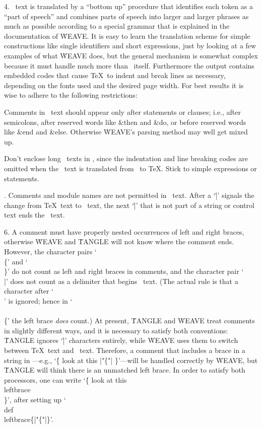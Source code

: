 4. \PASCAL\ text is translated by a ``bottom up'' procedure that
identifies each token as a ``part of speech'' and combines parts of speech
into larger and larger phrases as much as possible according to a special
grammar that is explained in the documentation of \.{WEAVE}. It is easy to
learn the translation scheme for simple constructions like single
identifiers and short expressions, just by looking at a few examples of
what \.{WEAVE} does, but the general mechanism is somewhat complex because
it must handle much more than \PASCAL\ itself. Furthermore the output
contains embedded codes that cause \TeX\ to indent and break lines as
necessary, depending on the fonts used and the desired page width. For
best results it is wise to adhere to the following restrictions:

\yskip{}Comments in \PASCAL\ text should appear only after
statements or clauses; i.e., after semicolons, after reserved words like
\&{then} and \&{do}, or before reserved words like \&{end} and \&{else}.
Otherwise \.{WEAVE}'s parsing method may well get mixed up.

Don't enclose long \PASCAL\ texts in \pb, since the
indentation and line breaking codes are omitted when the \pb\ text is
translated from \PASCAL\ to \TeX. Stick to simple expressions or
statements.

. Comments and module names are not permitted in \pb\ text. After a `\.|'
signals the change from \TeX\ text to \PASCAL\ text, the next `\.|' that is
not part of a string or control text ends the \PASCAL\ text.

6. A comment must have properly nested occurrences of left and right
braces, otherwise \.{WEAVE} and \.{TANGLE} will not know where the comment
ends. However, the character pairs `\.{\\\{}' and `\.{\\\}}' do not count
as left and right braces in comments, and the character pair `\.{\\|}'
does not count as a delimiter that begins \PASCAL\ text. (The actual rule
is that a character after `\.\\' is ignored; hence in `\.{\\\\\{}' the
left brace {\sl does\/} count.) At present, \.{TANGLE} and \.{WEAVE} treat
comments in slightly different ways, and it is necessary to satisfy both
conventions: \.{TANGLE} ignores `\.|' characters entirely, while \.{WEAVE}
uses them to switch between \TeX\ text and \PASCAL\ text. Therefore, a
comment that includes a brace in a string in \pb---e.g., `\.{\{{ }look at
this |"\{"| \}}'---will be handled correctly by \.{WEAVE}, but \.{TANGLE}
will think there is an unmatched left brace. In order to satisfy both
processors, one can write `\.{\{{ }look at this \\leftbrace\\{ }\}}', after
setting up `\.{\\def\\leftbrace\{|"\{"|\}}'.

